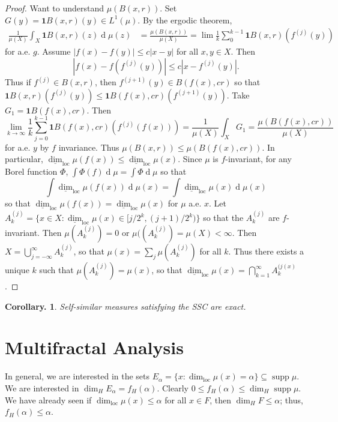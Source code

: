 \documentclass[11pt, a4paper]{memoir}
\theoremstyle{change}
\newtheorem{corollary}[theorem]{Corollary.}
\theoremstyle{plain}
\theoremstyle{nonumberplain}
\newtheorem{proof}{Proof}
\DeclareMathOperator{\supp}{supp}
\renewcommand{\d}[1]{\ensuremath{\operatorname{d}\!{#1}}}
\DeclareMathOperator{\loc}{loc}
\newcommand{\idc}{\mathbf{1}}
\numberwithin{equation}{section}
\begin{document}
\begin{proof}
    Want to understand $\mu(B(x,r))$.
    Set $G(y)=\idc{B(x,r)}(y)\in L^1(\mu)$.
    By the ergodic theorem,
    \begin{align*}
        \frac{1}{\mu(X)}\int_X\idc{B(x,r)}(z)\d{\mu(z)}&=\frac{\mu(B(x,r))}{\mu(X)}=\lim\frac{1}{k}\sum_{0}^{k-1}\idc{B(x,r)}(f^{(j)}(y))
    \end{align*}
    for a.e. $g$.
    Assume $|f(x)-f(y)|\leq c|x-y|$ for all $x,y\in X$.
    Then
    \begin{equation*}
        |f(x)-f(f^{(j)}(y))|\leq c|x-f^{(j)}(y)|.
    \end{equation*}
    Thus if $f^{(j)}\in B(x,r)$, then $f^{(j+1)}(y)\in B(f(x),cr)$ so that $\idc{B(x,r)}(f^{(j)}(y))\leq\idc{B(f(x),cr)}(f^{(j+1)}(y))$.
    Take $G_1=\idc{B(f(x),cr)}$.
    Then
    \begin{equation*}
        \lim_{k\to\infty}\frac{1}{k}\sum_{j=0}^{k-1}\idc{B(f(x),cr)}(f^{(j)}(f(x)))=\frac{1}{\mu(X)}\int_X G_1=\frac{\mu(B(f(x),cr))}{\mu(X)}
    \end{equation*}
    for a.e. $y$ by $f$ invariance.
    Thus $\mu(B(x,r))\leq\mu(B(f(x),cr))$.
    In particular, $\underline{\dim}_{\loc}\mu(f(x))\leq\underline{\dim}_{\loc}\mu(x)$.
    Since $\mu$ is $f$-invariant, for any Borel function $\Phi$, $\int\Phi(f)\d{\mu}=\int\Phi\d{\mu}$ so that
    \begin{equation*}
        \int\underline{\dim}_{\loc}\mu(f(x))\d{\mu(x)}=\int\underline{\dim}_{\loc}\mu(x)\d{\mu(x)}
    \end{equation*}
    so that $\underline{\dim}_{\loc}\mu(f(x))=\underline{\dim}_{\loc}\mu(x)$ for $\mu$ a.e. $x$.
    Let $A_k^{(j)}=\{x\in X:\underline{\dim}_{\loc}\mu(x)\in[j/2^k,(j+1)/2^k)\}$ so that the $A_k^{(j)}$ are $f$-invariant.
    Then $\mu(A_k^{(j)})=0$ or $\mu((A_k^{(j)})=\mu(X)<\infty$.
    Then $X=\bigcup_{j=-\infty}^\infty A_k^{(j)}$, so that $\mu(x)=\sum_j\mu(A_k^{(j)})$ for all $k$.
    Thus there exists a unique $k$ such that $\mu(A_k^{(j)})=\mu(x)$, so that $\underline{\dim}_{\loc}\mu(x)=\bigcap_{k=1}^\infty A_k^{(j(x)}$.
\end{proof}
\begin{corollary}
    Self-similar measures satisfying the SSC are exact.
\end{corollary}
\section{Multifractal Analysis}
In general, we are interested in the sets $E_\alpha=\{x:\dim_{\loc}\mu(x)=\alpha\}\subseteq\supp\mu$.
We are interested in $\dim_HE_\alpha=f_H(\alpha)$.
Clearly $0\leq f_H(\alpha)\leq\dim_H\supp\mu$.
We have already seen if $\dim_{\loc}\mu(x)\leq\alpha$ for all $x\in F$, then $\dim_HF\leq\alpha$; thus, $f_H(\alpha)\leq\alpha$.
\end{document}
